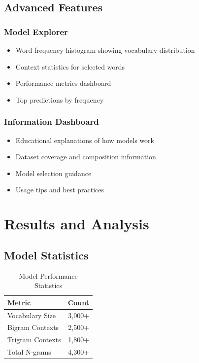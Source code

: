 \documentclass[12pt,a4paper]{report}
\begin{document}
\section{Advanced Features}

\subsection{Model Explorer}
\begin{itemize}
    \item Word frequency histogram showing vocabulary distribution
    \item Context statistics for selected words
    \item Performance metrics dashboard
    \item Top predictions by frequency
\end{itemize}

\subsection{Information Dashboard}
\begin{itemize}
    \item Educational explanations of how models work
    \item Dataset coverage and composition information
    \item Model selection guidance
    \item Usage tips and best practices
\end{itemize}

\chapter{Results and Analysis}

\section{Model Statistics}

\begin{table}[H]
\centering
\begin{tabular}{|l|r|}
\hline
\textbf{Metric} & \textbf{Count} \\
\hline
Vocabulary Size & 3,000+ \\
Bigram Contexts & 2,500+ \\
Trigram Contexts & 1,800+ \\
Total N-grams & 4,300+ \\
\hline
\end{tabular}
\caption{Model Performance Statistics}
\end{table}
\end{document}
